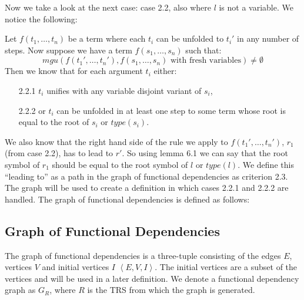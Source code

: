 Now we take a look at the next case: case 2.2, also where $l$ is not a variable. We notice the following: 

Let $f(t_1, \dots, t_n)$ be a term where each $t_i$ can be unfolded to $t_i'$ in any number of steps. Now suppose we have a term $f(s_1, \dots, s_n)$ such that:
\[
\textit{mgu}(f(t_1', \dots, t_n'), f(s_1, \dots, s_n) \text{ with fresh variables}) \neq \emptyset
\]
Then we know that for each argument $t_i$ either:
\begin{enumerate}
    \itemsep 0em
    \item[2.2.1] $t_i$ unifies with any variable disjoint variant of $s_i$, 
    \item[2.2.2] or $t_i$ can be unfolded in at least one step to some term whose root is equal to the root of $s_i$ or $\textit{type}(s_i)$. 
\end{enumerate}  

We also know that the right hand side of the rule we apply to $f(t_1', \dots, t_n')$, $r_1$ (from case 2.2), has to lead to $r'$. So using lemma 6.1 we can say that the root symbol of $r_1$ should be equal to the root symbol of $l$ or $\textit{type}(l)$. We define this ``leading to'' as a path in the graph of functional dependencies as criterion 2.3. The graph will be used to create a definition in which cases 2.2.1 and 2.2.2 are handled. The graph of functional dependencies is defined as follows: 

\subsection*{Graph of Functional Dependencies}
The graph of functional dependencies is a three-tuple consisting of the edges $E$, vertices $V$ and initial vertices $I$ $\left< E, V, I \right>$. The initial vertices are a subset of the vertices and will be used in a later definition. We denote a functional dependency graph as $G_R$, where $R$ is the TRS from which the graph is generated. 

